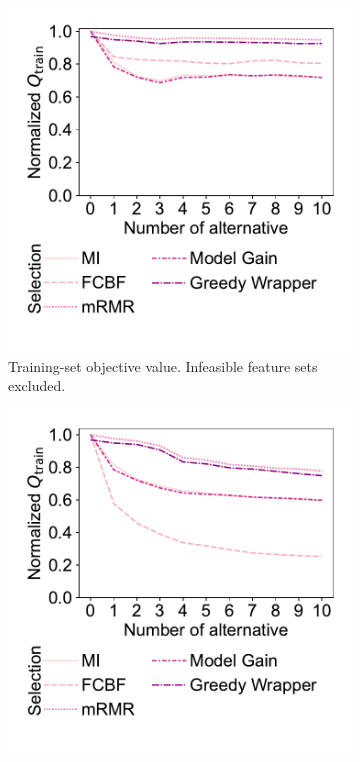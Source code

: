 \documentclass{article}
\theoremstyle{definition}
\begin{document}
\begin{figure}[p]
	\centering
	\begin{subfigure}[t]{0.48\textwidth}
		\centering
		\includegraphics[width=\textwidth, trim=20 40 15 15, clip]{plots/afs-impact-num-alternatives-fs-method-train-objective-max.pdf}
		\caption{
			Training-set objective value.
			Infeasible feature sets excluded.
		}
		\label{fig:afs:impact-num-alternatives-fs-method-train-objective-max}
	\end{subfigure}
	\hfill
	\begin{subfigure}[t]{0.48\textwidth}
		\centering
		\includegraphics[width=\textwidth, trim=20 40 15 15, clip]{plots/afs-impact-num-alternatives-fs-method-train-objective-max-fillna.pdf}

\end{subfigure}
\end{figure}
\end{document}
